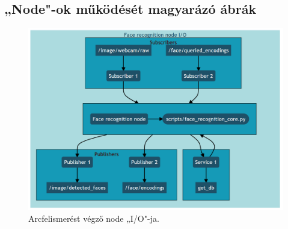 \appendix
\chapter*{\melleklet}
\setcounter{chapter}{\annexletter} %
\setcounter{section}{0}

\section{„Node"-ok működését magyarázó ábrák}
\begin{figure}[!ht]
    \centering
    \includegraphics[width=150mm, keepaspectratio]{02_mermaid/facenode2.png}
    \caption{Arcfelismerést végző node „I/O"-ja.}
    \label{fig:frio}
\end{figure}

\clearpage
